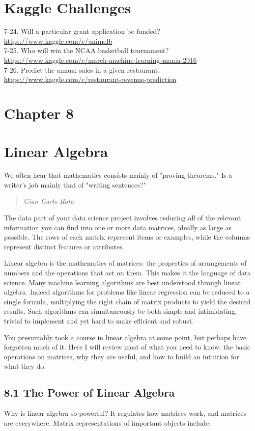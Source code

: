 \documentclass[10pt]{article}
\begin{document}
\section*{Kaggle Challenges}
7-24. Will a particular grant application be funded?\\
\url{https://www.kaggle.com/c/unimelb}\\
7-25. Who will win the NCAA basketball tournament? \url{https://www.kaggle.com/c/march-machine-learning-mania-2016}\\
7-26. Predict the annual sales in a given restaurant. \url{https://www.kaggle.com/c/restaurant-revenue-prediction}

\section*{Chapter 8}
\section*{Linear Algebra}
We often hear that mathematics consists mainly of "proving theorems." Is a writer's job mainly that of "writing sentences?"

\begin{quote}
\textit{Gian-Carlo Rota}
\end{quote}

The data part of your data science project involves reducing all of the relevant information you can find into one or more data matrices, ideally as large as possible. The rows of each matrix represent items or examples, while the columns represent distinct features or attributes.

Linear algebra is the mathematics of matrices: the properties of arrangements of numbers and the operations that act on them. This makes it the language of data science. Many machine learning algorithms are best understood through linear algebra. Indeed algorithms for problems like linear regression can be reduced to a single formula, multiplying the right chain of matrix products to yield the desired results. Such algorithms can simultaneously be both simple and intimidating, trivial to implement and yet hard to make efficient and robust.

You presumably took a course in linear algebra at some point, but perhaps have forgotten much of it. Here I will review most of what you need to know: the basic operations on matrices, why they are useful, and how to build an intuition for what they do.

\subsection*{8.1 The Power of Linear Algebra}
Why is linear algebra so powerful? It regulates how matrices work, and matrices are everywhere. Matrix representations of important objects include:
\end{document}
